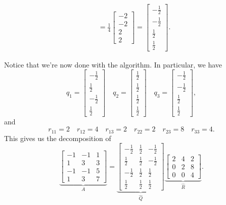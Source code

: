 \documentclass[letterpaper]{article}
\newcommand{\0}{\mathbf{0}}
\begin{document}
\begin{mdframed}
\begin{mdframed}
\begin{equation*}
\begin{aligned}
                    &= \frac{1}{4} \begin{bmatrix}
                        -2 \\ -2 \\ 2 \\ 2
                    \end{bmatrix} = \begin{bmatrix}
                        -\frac{1}{2} \\ -\frac{1}{2} \\ \frac{1}{2} \\ \frac{1}{2}
                    \end{bmatrix}.
            \end{aligned}
        \end{equation*}
    \end{mdframed}

    Notice that we're now done with the algorithm. In particular, we have 
    \[q_1 = \begin{bmatrix}
        -\frac{1}{2} \\ \frac{1}{2} \\ -\frac{1}{2} \\ \frac{1}{2}
    \end{bmatrix} \quad q_2 = \begin{bmatrix}
        \frac{1}{2} \\ \frac{1}{2} \\ \frac{1}{2} \\ \frac{1}{2}
    \end{bmatrix} \quad q_3 = \begin{bmatrix}
        -\frac{1}{2} \\ -\frac{1}{2} \\ \frac{1}{2} \\ \frac{1}{2}
    \end{bmatrix},\]
    and 
    \[r_{11} = 2 \quad r_{12} = 4 \quad r_{13} = 2 \quad r_{22} = 2 \quad r_{23} = 8 \quad r_{33} = 4.\]
    This gives us the decomposition of 
    \[\underbrace{\begin{bmatrix}
        -1 & -1 & 1 \\ 
        1 & 3 & 3 \\ 
        -1 & -1 & 5 \\ 
        1 & 3 & 7
    \end{bmatrix}}_{A} = \underbrace{\begin{bmatrix}
        -\frac{1}{2} & \frac{1}{2} & -\frac{1}{2} \\ 
        \frac{1}{2} & \frac{1}{2} & -\frac{1}{2} \\ 
        -\frac{1}{2} & \frac{1}{2} & \frac{1}{2} \\ 
        \frac{1}{2} & \frac{1}{2} & \frac{1}{2}
    \end{bmatrix}}_{\hat{Q}} \underbrace{\begin{bmatrix}
        2 & 4 & 2 \\ 
        0 & 2 & 8 \\ 
        0 & 0 & 4
    \end{bmatrix}}_{\hat{R}}.\]
\end{mdframed}
\end{document}
